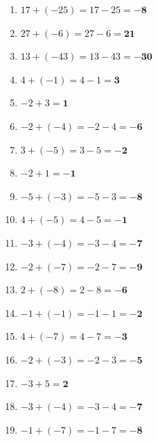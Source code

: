 \documentclass[a4paper,10pt]{article} %
\begin{document}
\begin{enumerate}
  \item \(17 + (-25) =
    17 - 25 =
    \mathbf{-8}\) %

  \item \(27 + (-6) =
    27 - 6 =
    \mathbf{21}\) %

  \item \(13 + (-43) =
    13 - 43 =
    \mathbf{-30}\) %

  \item \(4 + (-1) =
    4 - 1 =
    \mathbf{3}\) %

  \item \(-2 + 3 =
    \mathbf{1}\) %

  \item \(-2 + (-4) =
    -2 - 4 =
    \mathbf{-6}\) %

  \item \(3 + (-5) =
    3 - 5 =
    \mathbf{-2}\) %

  \item \(-2 + 1 =
    \mathbf{-1}\) %

  \item \(-5 + (-3) =
    -5 - 3 =
    \mathbf{-8}\) %

  \item \(4 + (-5) =
    4 - 5 =
    \mathbf{-1}\) %

  \item \(-3 + (-4) =
    -3 - 4 =
    \mathbf{-7}\) %

  \item \(-2 + (-7) =
    -2 - 7 =
    \mathbf{-9}\) %

  \item \(2 + (-8) =
    2 - 8 =
    \mathbf{-6}\) %

  \item \(-1 + (-1) =
    -1 - 1 =
    \mathbf{-2}\) %

  \item \(4 + (-7) =
    4 - 7 =
    \mathbf{-3}\) %

  \item \(-2 + (-3) =
    -2 - 3 =
    \mathbf{-5}\) %

  \item \(-3 + 5 =
    \mathbf{2}\) %

  \item \(-3 + (-4) =
    -3 - 4 =
    \mathbf{-7}\) %

  \item \(-1 + (-7) =
    -1 - 7 =
    \mathbf{-8}\) %


\end{enumerate}
\end{document}
